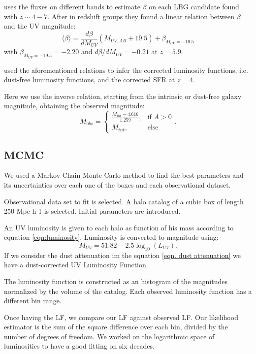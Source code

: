 \citet{bouwens12b} uses the fluxes on different bands to estimate $\beta$ on each LBG 
candidate found with $z \sim 4-7$. After in redshift groups they found a linear relation 
between $\beta$ and the UV magnitude:
\begin{equation}
\langle \beta \rangle = \frac{d \beta}{d M_{UV}} \left( M_{UV,AB}+19.5 \right) 
                                   + \beta_{M_{UV}=-19.5}
\end{equation}
with $ \beta_{M_{UV}=-19.5} = -2.20$ and $d \beta/d M_{UV} = -0.21$ at $z=5.9$.

\citet{smit12} used the aforementioned relations to infer the corrected luminosity functions,
i.e. dust-free luminosity functions, and the corrected SFR at $z=4$. 

Here we use the inverse relation, starting from the intrinsic or dust-free galaxy magnitude, 
obtaining the observed magnitude:
\begin{equation}\label{eqn. dust attenuation}
  M_{obs} = \begin{cases} 
                         \frac{M_{int}-4.616}{1.259}, &\mbox{if } A>0 \\
                         M_{int}, &\mbox{else}
                   \end{cases}.
\end{equation}


\subsection{MCMC}
We used a Markov Chain Monte Carlo method to find the best parameters and its 
uncertainties over each one of the boxes and each observational dataset.

Observational data set to fit is selected.
A halo catalog of a cubic box of length 250 Mpc h-1 is selected.
Initial parameters are introduced.

An UV luminosity is given to each halo as function of his mass according to equation
 \ref{eqn:luminosity}.
Luminosity is converted to magnitude using:
  \[ M_{UV} = 51.82 - 2.5 \log_{10}(L_{UV}). \]
If we consider the dust attenuation im the equation \ref{eqn. dust attenuation} we have
a dust-corrected UV Luminosity Function.

The luminosity function is constructed as an histogram of the magnitudes normalized by 
the volume of the catalog. Each observed luminosity function has a different bin range.

Once having the LF, we compare our LF against observed LF. Our likelihood estimator is 
the sum of the square difference over each bin, divided by the number of degrees of 
freedom. We worked on the logarithmic space of luminosities to have a good fitting on
six decades.

